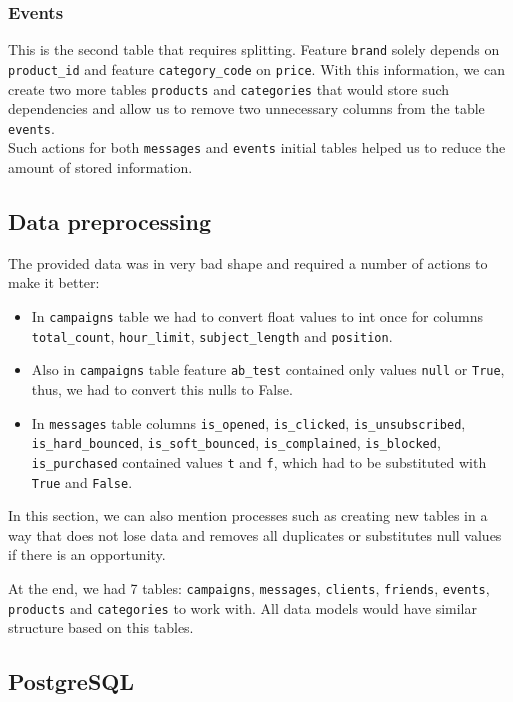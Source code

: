 \documentclass[conference]{IEEEtran}
\newcommand{\code}[1]{\colorbox{codegray}{\texttt{#1}}}
\begin{document}
\subsubsection{Events}

This is the second table that requires splitting. Feature \code{brand} solely depends on \code{product\_id} and feature \code{category\_code} on \code{price}. With this information, we can create two more tables \code{products} and \code{categories} that would store such dependencies and allow us to remove two unnecessary columns from the table \code{events}.
\\

Such actions for both \code{messages} and \code{events} initial tables helped us to reduce the amount of stored information.

\subsection{Data preprocessing}

The provided data was in very bad shape and required a number of actions to make it better:
\begin{itemize}
    \item In \code{campaigns} table we had to convert float values to int once for columns \code{total\_count}, \code{hour\_limit}, \code{subject\_length} and \code{position}.
    \item Also in \code{campaigns} table feature \code{ab\_test} contained only values \code{null} or \code{True}, thus, we had to convert this nulls to False.
    \item In \code{messages} table columns \code{is\_opened}, \code{is\_clicked}, \code{is\_unsubscribed}, \code{is\_hard\_bounced}, \code{is\_soft\_bounced}, \code{is\_complained}, \code{is\_blocked}, \code{is\_purchased} contained values \code{t} and \code{f}, which had to be substituted with \code{True} and \code{False}.
\end{itemize}

In this section, we can also mention processes such as creating new tables in a way that does not lose data and removes all duplicates or substitutes null values if there is an opportunity.

At the end, we had 7 tables: \code{campaigns}, \code{messages}, \code{clients}, \code{friends}, \code{events}, \code{products} and \code{categories} to work with. All data models would have similar structure based on this tables.

\subsection{PostgreSQL}
\end{document}
